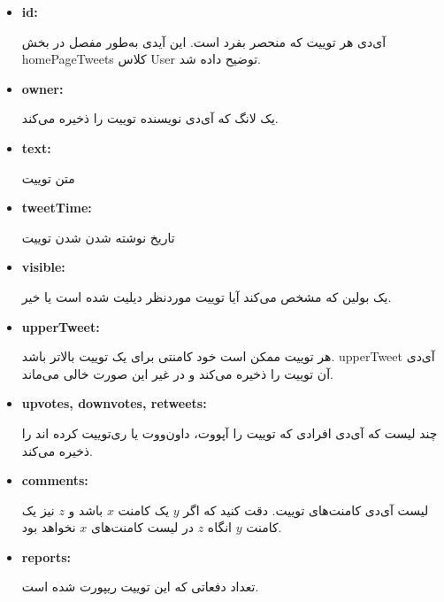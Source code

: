 \documentclass[12pt]{article}
\begin{document}
\begin{itemize}

\item
\begin{latin}
\textbf{id:}
\end{latin}
آی‌دی هر توییت که منحصر بفرد است. این آیدی به‌طور مفصل در بخش homePageTweets کلاس User توضیح داده شد.

\item
\begin{latin}
\textbf{owner:}
\end{latin}
یک لانگ که آی‌دی نویسنده توییت را ذخیره می‌کند.

\item
\begin{latin}
\textbf{text:}
\end{latin}
متن توییت

\item
\begin{latin}
\textbf{tweetTime:}
\end{latin}
تاریخ نوشته شدن شدن توییت

\item
\begin{latin}
\textbf{visible:}
\end{latin}
یک بولین که مشخص می‌کند آیا توییت موردنظر دیلیت شده است یا خیر.

\item
\begin{latin}
\textbf{upperTweet:}
\end{latin}
هر توییت ممکن است خود کامنتی برای یک توییت بالاتر باشد. upperTweet آی‌دی آن توییت را ذخیره می‌کند و در غیر این صورت خالی می‌ماند.

\item
\begin{latin}
\textbf{upvotes, downvotes, retweets:}
\end{latin}
چند لیست که آی‌دی افرادی که توییت را آپووت، داون‌ووت یا ری‌توییت کرده اند را ذخیره می‌کند.

\item
\begin{latin}
\textbf{comments:}
\end{latin}
لیست آی‌دی کامنت‌های توییت. دقت کنید که اگر $y$ یک کامنت $x$ باشد و $z$ نیز یک کامنت $y$ انگاه $z$ در لیست کامنت‌های $x$ نخواهد بود.

\item
\begin{latin}
\textbf{reports:}
\end{latin}
تعداد دفعاتی که این توییت ریپورت شده است.

\end{itemize}
\end{document}

